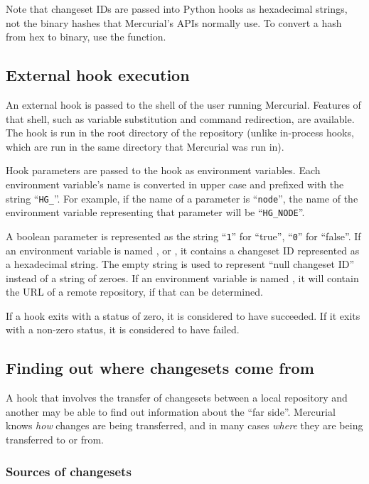 Note that changeset IDs are passed into Python hooks as hexadecimal
strings, not the binary hashes that Mercurial's APIs normally use.  To
convert a hash from hex to binary, use the
 function.

\subsection{External hook execution}

An external hook is passed to the shell of the user running Mercurial.
Features of that shell, such as variable substitution and command
redirection, are available.  The hook is run in the root directory of
the repository (unlike in-process hooks, which are run in the same
directory that Mercurial was run in).

Hook parameters are passed to the hook as environment variables.  Each
environment variable's name is converted in upper case and prefixed
with the string ``\texttt{HG\_}''.  For example, if the name of a
parameter is ``\texttt{node}'', the name of the environment variable
representing that parameter will be ``\texttt{HG\_NODE}''.

A boolean parameter is represented as the string ``\texttt{1}'' for
``true'', ``\texttt{0}'' for ``false''.  If an environment variable is
named ,  or , it
contains a changeset ID represented as a hexadecimal string.  The
empty string is used to represent ``null changeset ID'' instead of a
string of zeroes.  If an environment variable is named
, it will contain the URL of a remote repository, if
that can be determined.

If a hook exits with a status of zero, it is considered to have
succeeded.  If it exits with a non-zero status, it is considered to
have failed.

\subsection{Finding out where changesets come from}

A hook that involves the transfer of changesets between a local
repository and another may be able to find out information about the
``far side''.  Mercurial knows \emph{how} changes are being
transferred, and in many cases \emph{where} they are being transferred
to or from.

\subsubsection{Sources of changesets}
\label{sec:hook:sources}

